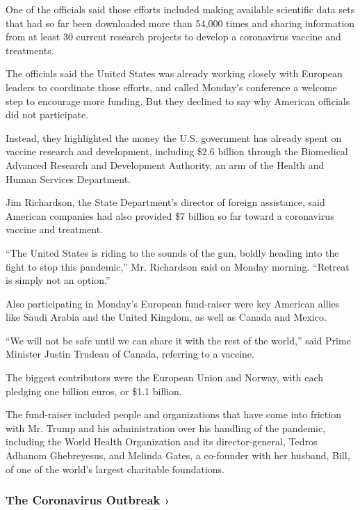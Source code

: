 One of the officials said those efforts included making available
scientific data sets that had so far been downloaded more than 54,000
times and sharing information from at least 30 current research projects
to develop a coronavirus vaccine and treatments.

The officials said the United States was already working closely with
European leaders to coordinate those efforts, and called Monday's
conference a welcome step to encourage more funding. But they declined
to say why American officials did not participate.

Instead, they highlighted the money the U.S. government has already
spent on vaccine research and development, including \$2.6 billion
through the Biomedical Advanced Research and Development Authority, an
arm of the Health and Human Services Department.

Jim Richardson, the State Department's director of foreign assistance,
said American companies had also provided \$7 billion so far toward a
coronavirus vaccine and treatment.

``The United States is riding to the sounds of the gun, boldly heading
into the fight to stop this pandemic,'' Mr. Richardson said on Monday
morning. ``Retreat is simply not an option.''

Also participating in Monday's European fund-raiser were key American
allies like Saudi Arabia and the United Kingdom, as well as Canada and
Mexico.

``We will not be safe until we can share it with the rest of the
world,'' said Prime Minister Justin Trudeau of Canada, referring to a
vaccine.

The biggest contributors were the European Union and Norway, with each
pledging one billion euros, or \$1.1 billion.

The fund-raiser included people and organizations that have come into
friction with Mr. Trump and his administration over his handling of the
pandemic, including the World Health Organization and its
director-general, Tedros Adhanom Ghebreyesus, and Melinda Gates, a
co-founder with her husband, Bill, of one of the world's largest
charitable foundations.

\href{https://www.nytimes3xbfgragh.onion/news-event/coronavirus?action=click\&pgtype=Article\&state=default\&region=MAIN_CONTENT_3\&context=storylines_faq}{}

\hypertarget{the-coronavirus-outbreak-}{%
\subsubsection{The Coronavirus Outbreak
›}\label{the-coronavirus-outbreak-}}

